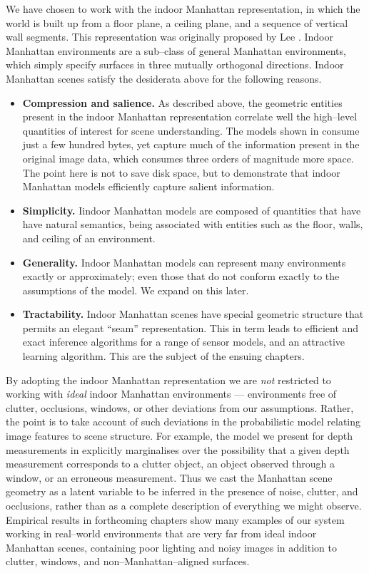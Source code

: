 We have chosen to work with the indoor Manhattan representation, in
which the world is built up from a floor plane, a ceiling plane, and a
sequence of vertical wall segments. This representation was originally
proposed by Lee \etal \cite{Lee09}. Indoor Manhattan environments are
a sub--class of general Manhattan environments, which simply specify
surfaces in three mutually orthogonal directions. Indoor Manhattan
scenes satisfy the desiderata above for the following reasons.
\begin{itemize}
  \item{\textbf{Compression and salience.} As described above, the
    geometric entities present in the indoor Manhattan representation
    correlate well the high--level quantities of interest for scene
    understanding. The models shown in  consume
    just a few hundred bytes, yet capture much of the information
    present in the original image data, which consumes three orders of
    magnitude more space. The point here is not to save disk space,
    but to demonstrate that indoor Manhattan models efficiently capture
    salient information.}
  \item{\textbf{Simplicity.} Iindoor Manhattan models are composed of
    quantities that have 
    have natural semantics, being associated with entities such as the
    floor, walls, and ceiling of an environment.}
  \item{\textbf{Generality.} Indoor Manhattan models can represent
    many environments exactly or approximately; even those that do not
    conform exactly to the assumptions of the model. We expand on this later.}
  \item{\textbf{Tractability.} Indoor Manhattan scenes have special
    geometric structure that permits an elegant ``seam''
    representation. This in term leads to efficient and exact
    inference algorithms for a range of sensor models, and an
    attractive learning algorithm. This are the subject of the ensuing
    chapters.}
\end{itemize}

By adopting the indoor Manhattan representation we are \textit{not}
restricted to working with \textit{ideal} indoor Manhattan
environments --- environments free of clutter, occlusions, windows,
or other deviations from our assumptions. Rather, the point is to take
account of such deviations in the probabilistic model relating image
features to scene structure. For example, the model we present for
depth measurements in  explicitly marginalises over
the possibility that a given depth measurement corresponds to a
clutter object, an object observed through a window, or an erroneous
measurement. Thus we cast the Manhattan scene geometry as a latent
variable to be inferred in the presence of noise, clutter, and
occlusions, rather than as a complete description of everything we
might observe. Empirical results in forthcoming chapters show many
examples of our system working in real--world environments that are
very far from ideal indoor Manhattan scenes, containing poor lighting
and noisy images in addition to clutter, windows, and
non--Manhattan--aligned surfaces.

